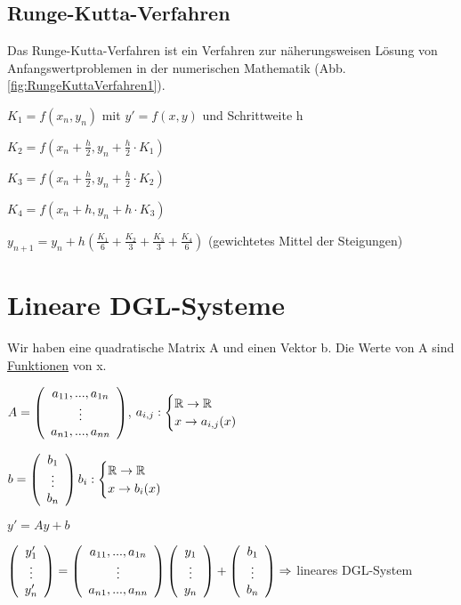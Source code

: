 \renewcommand{\ldate}{2015-12-11}

\subsection{Runge-Kutta-Verfahren}
Das Runge-Kutta-Verfahren ist ein Verfahren zur näherungsweisen Lösung von Anfangswertproblemen in der numerischen Mathematik (Abb. \ref{fig:RungeKuttaVerfahren1}).

$ K_1 = f(x_{n}, y_{n})$ mit $y'=f(x,y)$ und Schrittweite h

$ K_2 = f(x_{n} + \frac{h}{2}, y_{n} + \frac{h}{2} \cdot K_1)$

$ K_3 = f(x_{n} + \frac{h}{2}, y_{n} + \frac{h}{2} \cdot K_2)$

$ K_4 = f(x_{n} + h, y_{n} + h \cdot K_3)$

$y_{n+1} = y_n + h (\frac{K_1}{6} + \frac{K_2}{3} + \frac{K_3}{3} + \frac{K_4}{6})$ (gewichtetes Mittel der Steigungen) 

\section{Lineare DGL-Systeme}
Wir haben eine quadratische Matrix A und einen Vektor b. Die Werte von A sind \underline{Funktionen} von x. 

$A =   \left(  \begin{array}{c} a_{11}, ..., a_{1n}\\\vdots\\a_{n1}, ..., a_{nn} \end{array}  \right)  $,
$a_{i,j} : \begin{cases} \mathbb{R} \rightarrow \mathbb{R}\\x\rightarrow a_{i,j}(x) \end{cases}$

$b=  \left(  \begin{array}{c} b_1\\\vdots\\b_n \end{array}  \right)   b_i : \begin{cases} \mathbb{R} \rightarrow \mathbb{R}\\x\rightarrow b_{i}(x) \end{cases}$

$y' = Ay + b$

$  \left(  \begin{array}{c} y_1'\\\vdots\\y_n' \end{array}  \right)   =   \left(  \begin{array}{c} a_{11}, ..., a_{1n}\\\vdots\\a_{n1}, ..., a_{nn} \end{array}  \right)     \left(  \begin{array}{c} y_1\\\vdots\\y_n \end{array}  \right)   +   \left(  \begin{array}{c} b_1\\\vdots\\b_n \end{array}  \right)   \Rightarrow $ lineares DGL-System

